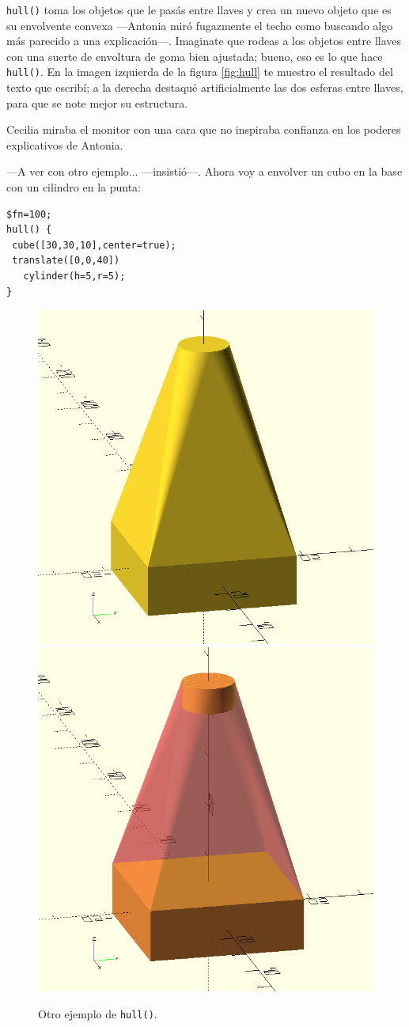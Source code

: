     \guillemotright \lstinline!hull()! toma los objetos que le pasás
    entre llaves y crea un nuevo objeto que es su envolvente convexa
    ---Antonia miró fugazmente el techo como buscando algo más
    parecido a una explicación---. Imaginate que rodeas a los objetos
    entre llaves con una suerte de envoltura de goma bien ajustada;
    bueno, eso es lo que hace \lstinline!hull()!.  En la imagen
    izquierda de la figura \ref{fig:hull} te muestro el resultado del
    texto que escribí; a la derecha destaqué artificialmente las dos
    esferas entre llaves, para que se note mejor su estructura.

    Cecilia miraba el monitor con una cara que no inspiraba confianza
    en los poderes explicativos de Antonia.

---A ver con otro ejemplo... ---insistió---. Ahora voy
  a envolver un cubo en la base con un cilindro en la punta:

    \begin{lstlisting}
$fn=100;
hull() {
 cube([30,30,10],center=true);
 translate([0,0,40])
   cylinder(h=5,r=5);
}
    \end{lstlisting}%

    \begin{figure}[ht]
      \centering
  \includegraphics[width=.46\textwidth]{imagenes/hull-3}\hfill
  \includegraphics[width=.46\textwidth]{imagenes/hull-4}      
  \caption{Otro ejemplo de \lstinline!hull()!.}
      \label{fig:hull-2}
    \end{figure}


